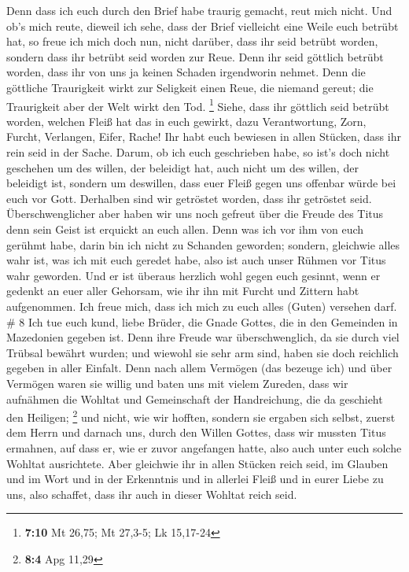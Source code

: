  Denn dass ich euch durch den Brief habe traurig gemacht,
reut mich nicht. Und ob's mich reute, dieweil ich sehe, dass der Brief
vielleicht eine Weile euch betrübt hat,  so freue ich mich
doch nun, nicht darüber, dass ihr seid betrübt worden, sondern dass ihr
betrübt seid worden zur Reue. Denn ihr seid göttlich betrübt worden,
dass ihr von uns ja keinen Schaden irgendworin nehmet. 
Denn die göttliche Traurigkeit wirkt zur Seligkeit einen Reue, die
niemand gereut; die Traurigkeit aber der Welt wirkt den Tod. \footnote{\textbf{7:10}
  Mt 26,75; Mt 27,3-5; Lk 15,17-24}  Siehe, dass ihr
göttlich seid betrübt worden, welchen Fleiß hat das in euch gewirkt,
dazu Verantwortung, Zorn, Furcht, Verlangen, Eifer, Rache! Ihr habt euch
bewiesen in allen Stücken, dass ihr rein seid in der Sache.
 Darum, ob ich euch geschrieben habe, so ist's doch nicht
geschehen um des willen, der beleidigt hat, auch nicht um des willen,
der beleidigt ist, sondern um deswillen, dass euer Fleiß gegen uns
offenbar würde bei euch vor Gott.  Derhalben sind wir
getröstet worden, dass ihr getröstet seid. Überschwenglicher aber haben
wir uns noch gefreut über die Freude des Titus denn sein Geist ist
erquickt an euch allen.  Denn was ich vor ihm von euch
gerühmt habe, darin bin ich nicht zu Schanden geworden; sondern,
gleichwie alles wahr ist, was ich mit euch geredet habe, also ist auch
unser Rühmen vor Titus wahr geworden.  Und er ist überaus
herzlich wohl gegen euch gesinnt, wenn er gedenkt an euer aller
Gehorsam, wie ihr ihn mit Furcht und Zittern habt aufgenommen.
 Ich freue mich, dass ich mich zu euch alles (Guten)
versehen darf. \# 8  Ich tue euch kund, liebe Brüder, die
Gnade Gottes, die in den Gemeinden in Mazedonien gegeben ist.
 Denn ihre Freude war überschwenglich, da sie durch viel
Trübsal bewährt wurden; und wiewohl sie sehr arm sind, haben sie doch
reichlich gegeben in aller Einfalt.  Denn nach allem
Vermögen (das bezeuge ich) und über Vermögen waren sie willig
 und baten uns mit vielem Zureden, dass wir aufnähmen die
Wohltat und Gemeinschaft der Handreichung, die da geschieht den
Heiligen; \footnote{\textbf{8:4} Apg 11,29}  und nicht, wie
wir hofften, sondern sie ergaben sich selbst, zuerst dem Herrn und
darnach uns, durch den Willen Gottes,  dass wir mussten
Titus ermahnen, auf dass er, wie er zuvor angefangen hatte, also auch
unter euch solche Wohltat ausrichtete.  Aber gleichwie ihr
in allen Stücken reich seid, im Glauben und im Wort und in der
Erkenntnis und in allerlei Fleiß und in eurer Liebe zu uns, also
schaffet, dass ihr auch in dieser Wohltat reich seid.

